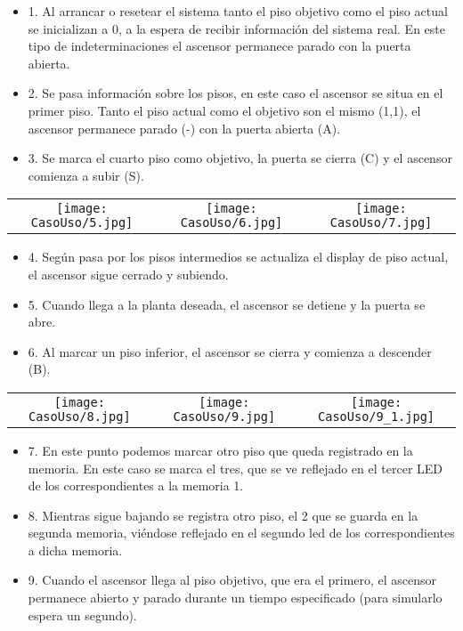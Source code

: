	\begin{itemize}
	    \item 1. Al arrancar o resetear el sistema tanto el piso objetivo como el piso actual se inicializan a 0, a la espera de recibir información del sistema real. En este tipo de indeterminaciones el ascensor permanece parado con la puerta abierta.	
	    \item 2. Se pasa información sobre los pisos, en este caso el ascensor se situa en el primer piso. Tanto el piso actual como el objetivo son el mismo (1,1), el ascensor permanece parado (-) con la puerta abierta (A).	
	    \item 3. Se marca el cuarto piso como objetivo, la puerta se cierra (C) y el ascensor comienza a subir (S).
	\end{itemize}
	
	\begin{table}[H]
	\centering
	\begin{tabular}{ccc}
		  \texttt{[image: CasoUso/5.jpg]} &
		 \texttt{[image: CasoUso/6.jpg]}  &
		  \texttt{[image: CasoUso/7.jpg]}   \\
	\end{tabular}
	\end{table}
	
	\begin{itemize}
	    \item 4. Según pasa por los pisos intermedios se actualiza el display de piso actual, el ascensor sigue cerrado y subiendo.	
	    \item 5.  Cuando llega a la planta deseada, el ascensor se detiene y la puerta se abre.	
	    \item 6.  Al marcar un piso inferior, el ascensor se cierra y comienza a descender (B).	
	\end{itemize}
	
	\begin{table}[H]
	\centering
	\begin{tabular}{ccc}
		 \texttt{[image: CasoUso/8.jpg]}   &
		 \texttt{[image: CasoUso/9.jpg]} &
		 \texttt{[image: CasoUso/9\_1.jpg]}  \\
	\end{tabular}
	\end{table}
	
	\begin{itemize}
	    \item 7. En este punto podemos marcar otro piso que queda registrado en la memoria. En este caso se marca el tres, que se ve reflejado en el tercer LED de los correspondientes a la memoria 1.	
	    \item 8. Mientras sigue bajando se registra otro piso, el 2 que se guarda en la segunda memoria, viéndose reflejado en el segundo led de los correspondientes a dicha memoria.	
	    \item 9. Cuando el ascensor llega al piso objetivo, que era el primero, el ascensor permanece abierto y parado durante un tiempo especificado (para simularlo espera un segundo).
	\end{itemize}
	
